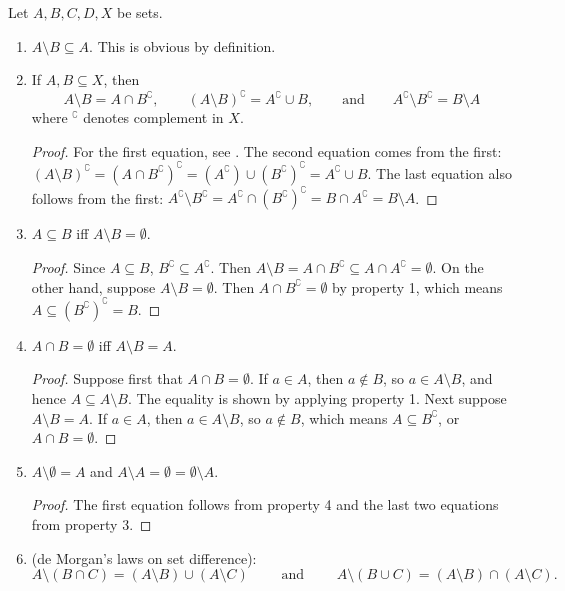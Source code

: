 \documentclass[12pt]{article}
\begin{document}
Let $A,B,C,D,X$ be sets.

\begin{enumerate}
\item $A\setminus B\subseteq A$.  This is obvious by definition.
\item If $A,B\subseteq X$, then $$A\setminus B = A\cap B^\complement,\qquad (A\setminus B)^\complement = A^\complement \cup B,\qquad\mbox{and}\qquad A^\complement\setminus B^\complement = B\setminus A$$ where $^\complement$ denotes complement in $X$.
\begin{proof}  For the first equation, see .  The second equation comes from the first: $(A\setminus B)^\complement=(A\cap B^\complement)^\complement = (A^\complement)\cup (B^\complement)^\complement = A^\complement \cup B$.  The last equation also follows from the first: $A^\complement\setminus B^\complement = A^\complement \cap (B^\complement)^\complement = B\cap A^\complement = B\setminus A$.
\end{proof}
\item $A\subseteq B$ iff $A\setminus B=\emptyset$.
\begin{proof}  Since $A\subseteq B$, $B^\complement \subseteq A^\complement$.  Then $A\setminus B= A\cap B^\complement \subseteq A\cap A^\complement=\emptyset$.  On the other hand, suppose $A\setminus B=\emptyset$.  Then $A\cap B^\complement = \emptyset$ by property 1, which means $A\subseteq (B^\complement)^\complement=B$.
\end{proof}
\item $A\cap B=\emptyset$ iff $A\setminus B=A$.
\begin{proof}  Suppose first that $A\cap B=\emptyset$.  If $a\in A$, then $a\notin B$, so $a\in A\setminus B$, and hence $A\subseteq A\setminus B$.  The equality is shown by applying property 1.  Next suppose $A\setminus B=A$.  If $a\in A$, then $a\in A\setminus B$, so $a\notin B$, which means $A\subseteq B^\complement$, or $A\cap B=\emptyset$.
\end{proof}
\item $A\setminus\emptyset = A$ and $A\setminus A = \emptyset = \emptyset\setminus A$.
\begin{proof} The first equation follows from property 4 and the last two equations from property 3. 
\end{proof}
\item (de Morgan's laws on set difference): $$A\setminus (B\cap C)=(A\setminus B)\cup (A\setminus C)\qquad \mbox{ and }\qquad A\setminus (B\cup C) = (A\setminus B)\cap (A\setminus C).$$

\end{enumerate}
\end{document}
